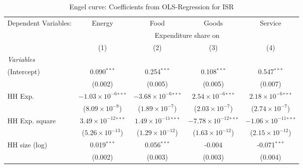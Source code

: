 
\begin{table}[htbp!]
   \centering
   \small
   \begin{adjustbox}{width = 1\textwidth, max height = 0.95\textheight, center}
      \begin{threeparttable}[b]
         \caption{\label{tab:Engel_parametric_ISR} Engel curve: Coefficients from OLS-Regression for ISR}
         \begin{tabular}{lcccc}
            \tabularnewline \midrule \midrule
            Dependent Variables: & Energy                         & Food                           & Goods                           & Service\\  
             & \multicolumn{4}{c}{Expenditure share on} \\ 
                                 & (1)                            & (2)                            & (3)                             & (4)\\  
            \midrule
            \emph{Variables}\\
            (Intercept)          & 0.090$^{***}$                  & 0.254$^{***}$                  & 0.108$^{***}$                   & 0.547$^{***}$\\   
                                 & (0.002)                        & (0.005)                        & (0.005)                         & (0.007)\\   
            HH Exp.              & $-1.03\times 10^{-6}$$^{***}$  & $-3.68\times 10^{-6}$$^{***}$  & $2.54\times 10^{-6}$$^{***}$    & $2.18\times 10^{-6}$$^{***}$\\    
                                 & ($8.09\times 10^{-8}$)         & ($1.89\times 10^{-7}$)         & ($2.03\times 10^{-7}$)          & ($2.74\times 10^{-7}$)\\    
            HH Exp. square       & $3.49\times 10^{-12}$$^{***}$  & $1.49\times 10^{-11}$$^{***}$  & $-7.78\times 10^{-12}$$^{***}$  & $-1.06\times 10^{-11}$$^{***}$\\    
                                 & ($5.26\times 10^{-13}$)        & ($1.29\times 10^{-12}$)        & ($1.63\times 10^{-12}$)         & ($2.15\times 10^{-12}$)\\    
            HH size (log)        & 0.019$^{***}$                  & 0.056$^{***}$                  & -0.004                          & -0.071$^{***}$\\   
                                 & (0.002)                        & (0.003)                        & (0.003)                         & (0.004)\\   

\end{tabular}
\end{threeparttable}
\end{adjustbox}
\end{table}
